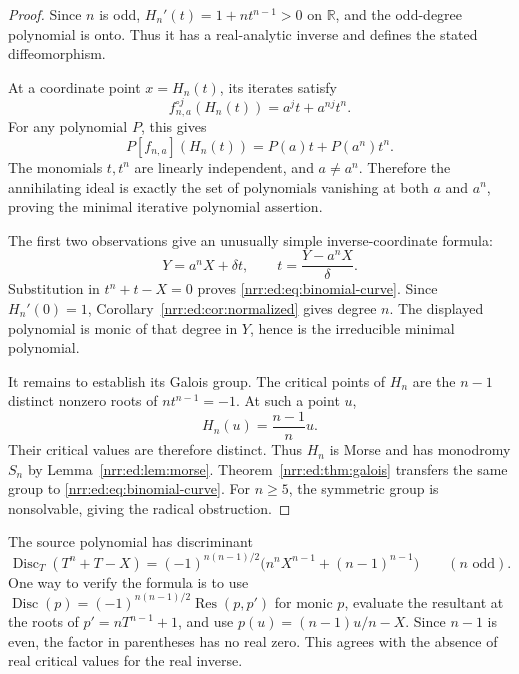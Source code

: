 \documentclass[11pt,letterpaper]{article}
\theoremstyle{definition}
\theoremstyle{remark}
\newcommand{\R}{\mathbb R}
\newcommand{\Disc}{\operatorname{Disc}}
\newcommand{\Res}{\operatorname{Res}}
\begin{document}
\begin{proof}
Since $n$ is odd,
$H_n'(t)=1+nt^{n-1}>0$ on $\R$, and the odd-degree polynomial is onto. Thus it
has a real-analytic inverse and defines the stated diffeomorphism.

At a coordinate point $x=H_n(t)$, its iterates satisfy
\begin{equation}
 f_{n,a}^{\circ j}(H_n(t))=a^jt+a^{nj}t^n.
 \label{nrr:ed:eq:binomial-orbits}
\end{equation}
For any polynomial $P$, this gives
\[
 P[f_{n,a}](H_n(t))=P(a)t+P(a^n)t^n.
\]
The monomials $t,t^n$ are linearly independent, and $a\ne a^n$. Therefore the
annihilating ideal is exactly the set of polynomials vanishing at both $a$ and
$a^n$, proving the minimal iterative polynomial assertion.

The first two observations give an unusually simple inverse-coordinate formula:
\begin{equation}
 Y=a^nX+\delta t,\qquad t=\frac{Y-a^nX}{\delta}.
 \label{nrr:ed:eq:binomial-recovery}
\end{equation}
Substitution in $t^n+t-X=0$ proves \eqref{nrr:ed:eq:binomial-curve}. Since $H_n'(0)=1$,
Corollary~\ref{nrr:ed:cor:normalized} gives degree $n$. The displayed polynomial is
monic of that degree in $Y$, hence is the irreducible minimal polynomial.

It remains to establish its Galois group. The critical points of $H_n$ are the
$n-1$ distinct nonzero roots of $nt^{n-1}=-1$. At such a point $u$,
\[
 H_n(u)=\frac{n-1}{n}u.
\]
Their critical values are therefore distinct. Thus $H_n$ is Morse and has
monodromy $S_n$ by Lemma~\ref{nrr:ed:lem:morse}. Theorem~\ref{nrr:ed:thm:galois} transfers the
same group to \eqref{nrr:ed:eq:binomial-curve}. For $n\ge5$, the symmetric group is
nonsolvable, giving the radical obstruction.
\end{proof}

The source polynomial has discriminant
\begin{equation}
 \Disc_T(T^n+T-X)
 =(-1)^{n(n-1)/2}\bigl(n^nX^{n-1}+(n-1)^{n-1}\bigr)
 \qquad(n\text{ odd}).
 \label{nrr:ed:eq:binomial-discriminant}
\end{equation}
One way to verify the formula is to use
$\Disc(p)=(-1)^{n(n-1)/2}\Res(p,p')$ for monic $p$, evaluate the resultant at
the roots of $p'=nT^{n-1}+1$, and use
$p(u)=(n-1)u/n-X$. Since $n-1$ is even, the factor in parentheses has no real
zero. This agrees with the absence of real critical values for the real inverse.
\end{document}
